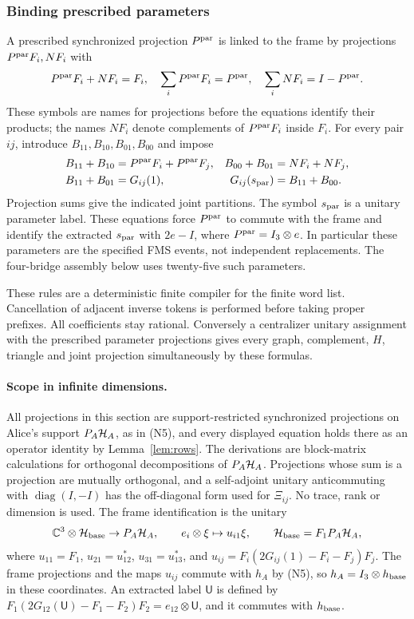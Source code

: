 \subsubsection{Binding prescribed parameters}
A prescribed synchronized projection $P^{\rm par}$ is linked to the frame by projections $P^{\rm par}F_i,NF_i$ with
\[
 P^{\rm par}F_i+NF_i=F_i,\quad \sum_iP^{\rm par}F_i=P^{\rm par},\quad\sum_iNF_i=I-P^{\rm par}.
\]
These symbols are names for projections before the equations identify their products; the names $NF_i$ denote complements of $P^{\rm par}F_i$ inside $F_i$. For every pair $ij$, introduce $B_{11},B_{10},B_{01},B_{00}$ and impose
\begin{align*}
 B_{11}+B_{10}&=P^{\rm par}F_i+P^{\rm par}F_j,&
 B_{00}+B_{01}&=NF_i+NF_j,\\
 B_{11}+B_{01}&=G_{ij}(1),&
 G_{ij}(s_{\rm par})&=B_{11}+B_{00}.
\end{align*}
Projection sums give the indicated joint partitions. The symbol $s_{\rm par}$ is a unitary parameter label. These equations force $P^{\rm par}$ to commute with the frame and identify the extracted $s_{\rm par}$ with $2e-I$, where $P^{\rm par}=I_3\otimes e$. In particular these parameters are the specified FMS events, not independent replacements. The four-bridge assembly below uses twenty-five such parameters.

These rules are a deterministic finite compiler for the finite word list. Cancellation of adjacent inverse tokens is performed before taking proper prefixes. All coefficients stay rational. Conversely a centralizer unitary assignment with the prescribed parameter projections gives every graph, complement, $H$, triangle and joint projection simultaneously by these formulas.

\paragraph{Scope in infinite dimensions.}
All projections in this section are support-restricted synchronized projections on Alice's support $P_A\mathcal H_A$, as in (N5), and every displayed equation holds there as an operator identity by Lemma~\ref{lem:rows}. The derivations are block-matrix calculations for orthogonal decompositions of $P_A\mathcal H_A$. Projections whose sum is a projection are mutually orthogonal, and a self-adjoint unitary anticommuting with $\operatorname{diag}(I,-I)$ has the off-diagonal form used for $\Xi_{ij}$. No trace, rank or dimension is used. The frame identification is the unitary
\[
 \mathbb C^3\otimes\mathcal H_{\rm base}\to P_A\mathcal H_A,\qquad e_i\otimes\xi\mapsto u_{i1}\xi,\qquad \mathcal H_{\rm base}=F_1P_A\mathcal H_A,
\]
where $u_{11}=F_1$, $u_{21}=u_{12}^*$, $u_{31}=u_{13}^*$, and $u_{ij}=F_i(2G_{ij}(1)-F_i-F_j)F_j$. The frame projections and the maps $u_{ij}$ commute with $h_A$ by (N5), so $h_A=I_3\otimes h_{\rm base}$ in these coordinates. An extracted label $\mathsf U$ is defined by $F_1(2G_{12}(\mathsf U)-F_1-F_2)F_2=e_{12}\otimes\mathsf U$, and it commutes with $h_{\rm base}$.

